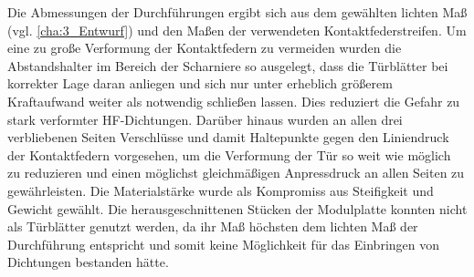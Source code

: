 

Die Abmessungen der Durchführungen ergibt sich aus dem gewählten lichten Maß (vgl. \Abschnitt\ref{cha:3_Entwurf}) und den Maßen der verwendeten Kontaktfederstreifen. Um eine zu große Verformung der Kontaktfedern zu vermeiden wurden die Abstandshalter im Bereich der Scharniere so ausgelegt, dass die Türblätter bei korrekter Lage daran anliegen und sich nur unter erheblich größerem Kraftaufwand weiter als notwendig schließen lassen. Dies reduziert die Gefahr zu stark verformter HF-Dichtungen. Darüber hinaus wurden an allen drei verbliebenen Seiten Verschlüsse und damit Haltepunkte gegen den Liniendruck der Kontaktfedern vorgesehen, um die Verformung der Tür so weit wie möglich zu reduzieren und einen möglichst gleichmäßigen Anpressdruck an allen Seiten zu gewährleisten. Die Materialstärke wurde als Kompromiss aus Steifigkeit und Gewicht gewählt. Die herausgeschnittenen Stücken der Modulplatte konnten nicht als Türblätter genutzt werden, da ihr Maß höchsten dem lichten Maß der Durchführung entspricht und somit keine Möglichkeit für das Einbringen von Dichtungen bestanden hätte.
\par
\vspace{\linespace}



